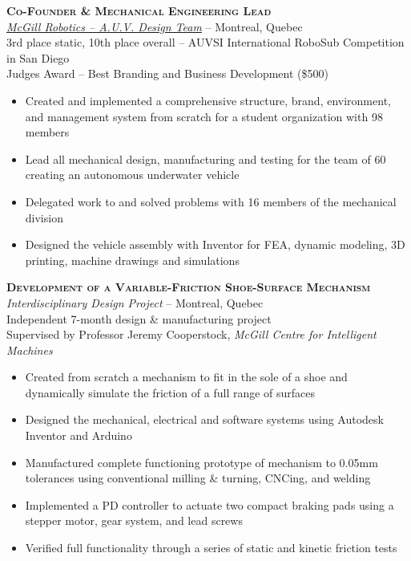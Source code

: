 \documentclass[12pt, letterpaper]{article}
\newcommand{\years}[1]{\marginnote{\footnotesize #1}} %
\begin{document}
	\begin{samepage}
		\years{8/2013 - 8/2014} \textbf{\scshape Co-Founder \& Mechanical Engineering Lead}\\
		\href {http://www.mcgillrobotics.com}{\textit{McGill Robotics -- A.U.V. Design Team}} -- Montreal, Quebec\\
		{\small 3rd place static, 10th place overall -- AUVSI International RoboSub Competition in San Diego}\\
		{\small Judges Award -- Best Branding and Business Development (\$500)}
		\begin{itemize}
			\item Created and implemented a comprehensive structure, brand, environment, and management system from scratch for a student organization with 98 members
			\item Lead all mechanical design, manufacturing and testing for the team of 60 creating an autonomous underwater vehicle 
			\item Delegated work to and solved problems with 16 members of the mechanical division
			\item Designed the vehicle assembly with Inventor for FEA, dynamic modeling, 3D printing, machine drawings and simulations
		\end{itemize}
	\end{samepage}

	\begin{samepage}
		\years{9/2013 - 7/2014} \textbf{\scshape Development of a Variable-Friction Shoe-Surface Mechanism}\\
		{\textit{Interdisciplinary Design Project}} -- Montreal, Quebec\\
		{\small Independent 7-month design \& manufacturing project}\\
		{\small Supervised by Professor Jeremy Cooperstock, \textsl {McGill Centre for Intelligent Machines}}
		\begin{itemize}
			\item Created from scratch a mechanism to fit in the sole of a shoe and dynamically simulate the friction of a full range of surfaces %
			\item Designed the mechanical, electrical and software systems using Autodesk Inventor and Arduino
			\item Manufactured complete functioning prototype of mechanism to 0.05mm tolerances using conventional milling \& turning, CNCing, and welding
			\item Implemented a PD controller to actuate two compact braking pads using a stepper motor, gear system, and lead screws
			\item Verified full functionality through a series of static and kinetic friction tests 
		\end{itemize}
	\end{samepage}
\end{document}
